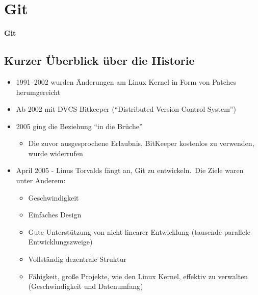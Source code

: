 \section{Git}\label{sec:git}

\begin{frame}[b]
    \begin{center}
        
    \end{center}
    \vfill
    \begin{flushleft}
        \Huge
        \textbf{Git}
    \end{flushleft}
\end{frame}

\subsection{Kurzer Überblick über die Historie}\label{subsec:kurzer-uberblick-uber-die-historie}

\begin{frame}
    \slidehead
    \vspace{-1em}
    \begin{itemize}[<+->]
        \item 1991--2002 wurden Änderungen am Linux Kernel in Form von Patches herumgereicht
        \item Ab 2002 mit DVCS Bitkeeper (\enquote{Distributed Version Control System})
        \item 2005 ging die Beziehung \enquote{in die Brüche}
        \begin{itemize}
            \item Die zuvor ausgesprochene Erlaubnis, BitKeeper kostenlos zu verwenden, wurde widerrufen
        \end{itemize}
        \item April 2005 - Linus Torvalds fängt an, Git zu entwickeln.\ Die Ziele waren unter Anderem:
        \begin{itemize}
            \item Geschwindigkeit
            \item Einfaches Design
            \item Gute Unterstützung von nicht-linearer Entwicklung (tausende parallele Entwicklungszweige)
            \item Vollständig dezentrale Struktur
            \item Fähigkeit, große Projekte, wie den Linux Kernel, effektiv zu verwalten (Geschwindigkeit und Datenumfang)
        \end{itemize}
    \end{itemize}
    \renewcommand{\thefootnote}{\relax}
\end{frame}
